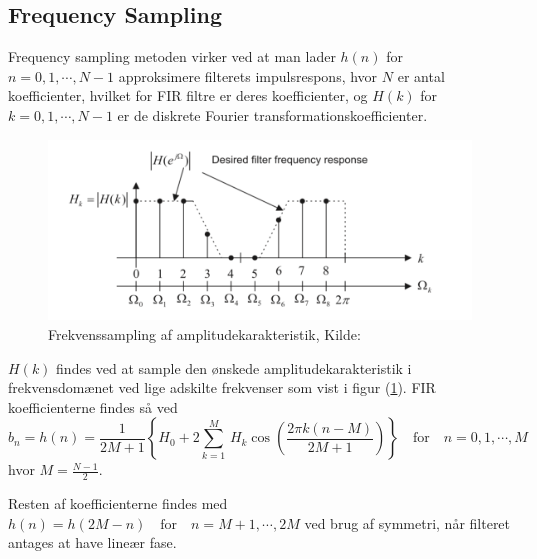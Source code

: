 \subsection{Frequency Sampling}
Frequency sampling metoden virker ved at man lader $h(n)$ for $n = 0, 1, \cdots, N - 1$ approksimere filterets impulsrespons, hvor $N$ er antal koefficienter, hvilket for FIR filtre er deres koefficienter, og $H(k)$ for $k = 0, 1, \cdots, N - 1$ er de diskrete Fourier transformationskoefficienter.
\begin{figure}[!ht]
	\includegraphics[width=\textwidth]{billeder/frequencysampling.png}
	\caption{Frekvenssampling af amplitudekarakteristik, Kilde:\cite{Tan2013}}
	\label{fig:frequencysampling}
\end{figure}
$H(k)$ findes ved at sample den ønskede amplitudekarakteristik i frekvensdomænet ved lige adskilte frekvenser som vist i figur (\ref{fig:frequencysampling}).\newline
FIR koefficienterne findes så ved
\begin{equation} \label{eq:fir_koefficienter}
b_n = h(n) = \frac{1}{2M + 1} \left\{H_0 + 2\displaystyle\sum_{k = 1}^{M}\, H_k\cos\left(\frac{2\pi k (n - M)}{2M + 1} \right) \right\} \quad \mathrm{for} \quad n = 0, 1, \cdots, M
\end{equation}
hvor $M = \frac{N - 1}{2}$.

Resten af koefficienterne findes med $h(n) = h(2M - n) \quad \mathrm{for} \quad n = M + 1, \cdots, 2M$ ved brug af symmetri, når filteret antages at have lineær fase\cite[p. 263]{Tan2013}.


